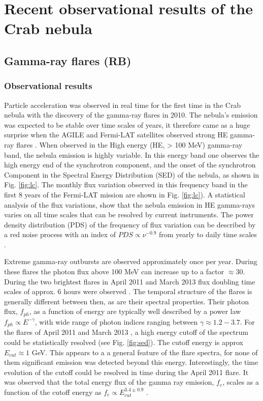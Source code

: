 \section{Recent observational results of the Crab nebula}
\subsection{Gamma-ray flares (RB)}
\subsubsection{Observational results}

Particle acceleration was observed in real time for the first time in the Crab nebula with the discovery of the gamma-ray flares in 2010.  The nebula's emission was expected to  be stable over time scales of years, it therefore came as a huge surprise when the AGILE and Fermi-LAT satellites observed strong HE gamma-ray flares \citep{Tavani2011,Abdo2011}. When observed in the High energy (HE, > 100 MeV) gamma-ray band, the nebula emission is highly variable. In this energy band one observes the high energy end of the synchrotron component, and the onset of the synchrotron Component in the Spectral Energy Distribution (SED) of the nebula, as shown in Fig. \ref{fig:lc}. The monthly flux variation observed in this frequency band in the first 8 years of the Fermi-LAT mission are shown in Fig. \ref{fig:lc}). A statistical analysis of the flux variations, show that the nebula emission in HE gamma-rays varies on all time scales that can be resolved by current instruments. The power density distribution (PDS) of the frequency of flux variation can be described by a red noise process with an index of $PDS \propto \nu^{-0.9}$  from yearly to daily time scales \citep{buehler2012}.

Extreme gamma-ray outbursts are observed approximately once per year. During these flares the photon flux above 100 MeV can increase up to a factor $\approx 30$. During the two brightest flares in April 2011 and March 2013 flux doubling time scales of approx. 6 hours were observed \citep{buehler2012,Mayer2013}. The temporal structure of the flares is generally different between then, as are their spectral properties. Their photon flux, $f_{ph}$,  as a function of energy are typically well described by a power law $f_{ph} \propto E^{-\gamma}$, with  wide range of photon indices ranging between  $\gamma \approx 1.2 - 3.7$. For the flares of April 2011 and March 2013 , a high energy cutoff of the spectrum could be statistically resolved (see Fig. \ref{fig:sed}). The cutoff energy is approx $E_{cut} \approx 1$ GeV. This appears to a a general feature of the flare spectra, for none of them significant emission was detected beyond this energy. Interestingly, the time evolution of the cutoff could be resolved in time during the April 2011 flare. It was observed that the total energy flux of the gamma ray emission, $f_e$,  scales as a function of the cutoff energy as $f_e \propto E_{cut}^{3.4 \pm 0.9}$  \citep{buehler2012}.

